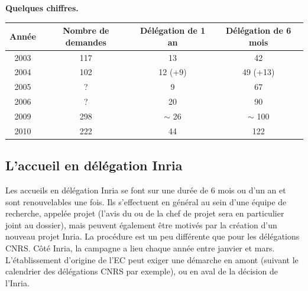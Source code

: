 \quad

\textbf{Quelques chiffres.}
\begin{center}
\begin{tabular}{*{4}{c}}
\toprule
Ann\'ee & Nombre de demandes & D\'el\'egation de 1 an & D\'el\'egation de 6 mois   \\
\midrule
2003    & 117                             &  13                          &  42                              \\ 
2004    &102                              &  12  (+9)                 &  49  (+13)                   \\ 
2005    &   ?                               &   9                            &  67                               \\ 
2006    &   ?                               & 20                            &  90                              \\ 
2009    &  298                               &  $\sim$ 26                &   $\sim$   100                 \\ 
2010  & 222                               &  44                           & 122                             \\ 
\bottomrule
\end{tabular}
\end{center}



\subsection*{L'accueil en d\'el\'egation Inria}


Les accueils en d\'el\'egation Inria se font sur une dur\'ee de 6 mois ou
d'un an et sont renouvelables une fois. Ils s'effectuent en
g\'en\'eral au sein d'une \'equipe de recherche, appel\'ee projet
(l'avis du ou de la chef de projet sera en particulier joint au dossier),
mais peuvent \'egalement \^etre motiv\'es par la cr\'eation d'un
nouveau projet Inria. La proc\'edure est un peu diff\'erente que
pour les d\'el\'egations CNRS. C\^ot\'e Inria, la campagne a lieu chaque ann\'ee entre janvier et mars.
L'\'etablissement d'origine de l'EC peut exiger une d\'emarche en amont (suivant le calendrier des d\'el\'egations CNRS par exemple), 
ou en aval de la d\'ecision de l'Inria. 

